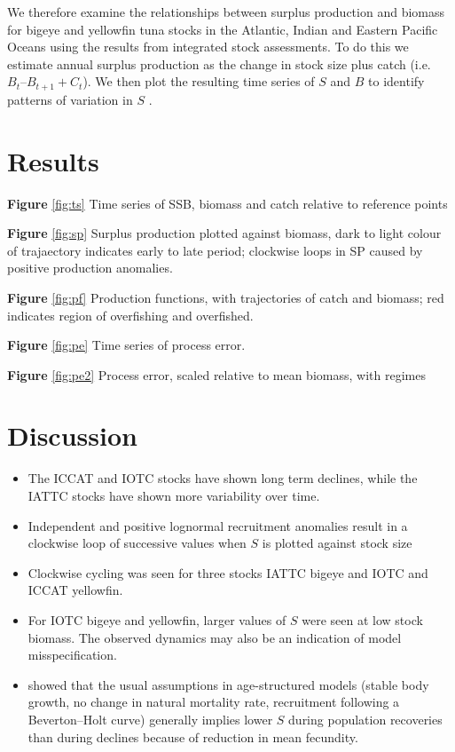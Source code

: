 \documentclass[12pt,doublespacing,a4paper]{ouparticle}
\begin{document}
We therefore examine the relationships between surplus production and biomass  for bigeye and yellowfin tuna stocks in the Atlantic, Indian and Eastern Pacific Oceans using the results from integrated stock assessments. To do this we estimate annual surplus production as the change in stock size plus catch (i.e. $B_t – B_{t+1} + C_t$). We then plot the resulting time series of $S$ and $B$ to identify patterns of variation in $S$ .  

\section{Results}

\textbf{Figure} \ref{fig:ts} Time series of SSB, biomass and catch relative to  reference points

\textbf{Figure} \ref{fig:sp} Surplus production plotted against biomass, dark to light colour of trajaectory indicates early to late period; clockwise loops in SP caused by positive production anomalies.

\textbf{Figure} \ref{fig:pf} Production functions, with trajectories of catch and biomass; red indicates region of overfishing and overfished.

\textbf{Figure} \ref{fig:pe} Time series of process error.

\textbf{Figure} \ref{fig:pe2} Process error, scaled relative to mean biomass, with regimes


\section{Discussion}

\begin{itemize}[labelindent=\parindent,noitemsep,topsep=0pt,parsep=0pt,partopsep=0pt]
\item The ICCAT and IOTC stocks have shown long term declines, while the IATTC stocks have shown more variability over time.  
 \item 
Independent and positive lognormal recruitment anomalies result in a clockwise loop of successive values when $S$ is plotted against stock size
\item Clockwise cycling was seen for three stocks IATTC bigeye and IOTC and ICCAT yellowfin.
 \item  For IOTC bigeye and yellowfin, larger values of $S$ were seen at low stock biomass. The observed dynamics may also be an indication of model misspecification.
\item \cite{walters} showed that the usual assumptions in age-structured models (stable body growth, no change in natural mortality rate, recruitment following a Beverton–Holt curve) generally implies lower $S$ during population recoveries than during declines because of reduction in mean fecundity.
\end{itemize}
\end{document}
